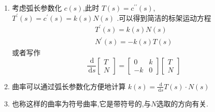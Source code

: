 \documentclass[../../古典微分几何.tex]{subfiles}
\begin{document}
\begin{remark}
    \begin{enumerate}
        \item 考虑弧长参数化 \(  c\left( s \right)   \),此时 \(  T\left( s \right)= c ^{\prime \prime}  \left( s \right)    \), \(  T^{\prime} \left( s \right)=  c^{\prime} \left( s \right)= k\left( s \right)N\left( s \right)      \)   
        .可以得到简洁的标架运动方程 \[
        \begin{aligned}
        T^{\prime} \left( s \right)= k\left( s \right)N\left( s \right)\\ 
         N^{\prime} \left( s \right)= -k\left( s \right)T\left( s \right)       
        \end{aligned}
        \]或者写作 \[
        \frac{\,\mathrm{d}  }{\,\mathrm{d} s }\begin{bmatrix} 
            T\\ 
             N 
        \end{bmatrix} =  \begin{bmatrix} 
            0&k\\ 
             -k&0 
        \end{bmatrix} \begin{bmatrix} 
            T\\ 
             N 
        \end{bmatrix}    
        \]

        \item 曲率可以通过弧长参数化方便地计算 \(  k\left( s \right) =  \frac{\,\mathrm{d}  }{\,\mathrm{d} s } T\left( s \right)\cdot N\left( s \right)     \) 
        \item 也称这样的曲率为符号曲率,它是带符号的,与\(  N  \)选取的方向有关. 
    \end{enumerate}
    
\end{remark}
\end{document}
